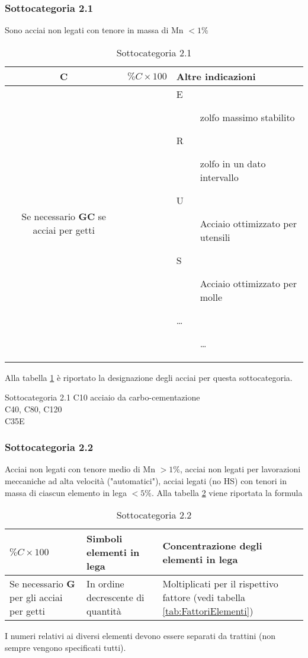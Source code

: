 \subsubsection{Sottocategoria 2.1}
Sono acciai non legati con tenore in massa di Mn $<1\%$

\begin{table}
\centering
\caption{Sottocategoria 2.1}
\label{tab:Sotto1}
\begin{tabularx}{\textwidth}{|c|X|X|}
\toprule
\textbf{C} & \textbf{$\%C \times 100$} & \textbf{Altre indicazioni}\\
\midrule
Se necessario \textbf{GC} se acciai per getti
&&
\begin{description}
\item[E] zolfo massimo stabilito
\item[R] zolfo in un dato intervallo
\item[U] Acciaio ottimizzato per utensili
\item[S] Acciaio ottimizzato per molle
\item[\dots] \dots
\end{description}\\
\bottomrule
\end{tabularx}
\end{table}

Alla tabella \ref{tab:Sotto1} è riportato la designazione degli acciai per questa sottocategoria.

\begin{example}{Sottocategoria 2.1}
C10 acciaio da carbo-cementazione\\
C40, C80, C120\\
C35E
\end{example}

\subsubsection{Sottocategoria 2.2}
Acciai non legati con tenore medio di Mn $>1\%$, acciai non legati per lavorazioni meccaniche ad alta velocità ("automatici"), acciai legati (no HS) con tenori in massa di ciascun elemento in lega $<5\%$. Alla tabella \ref{tab:Sotto2} viene riportata la formula

\begin{table}
\centering
\caption{Sottocategoria 2.2}\label{tab:Sotto2}
\begin{tabularx}{\textwidth}{|X|X|X|}
\toprule
\textbf{$\%C \times 100$} & \textbf{Simboli elementi in lega} & \textbf{Concentrazione degli elementi in lega}\\
\midrule
Se necessario \textbf{G} per gli acciai per getti &
In ordine decrescente di quantità &
Moltiplicati per il rispettivo fattore (vedi tabella \ref{tab:FattoriElementi})\\
\bottomrule
\end{tabularx}
\end{table}
I numeri relativi ai diversi elementi devono essere separati da trattini (non sempre vengono specificati tutti).

